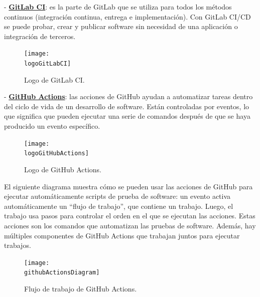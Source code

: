 - \textbf{\underline{GitLab CI}}: es la parte de GitLab que se utiliza para todos los métodos continuos (integración continua, entrega e implementación). Con GitLab CI/CD se puede probar, crear y publicar software sin necesidad de una aplicación o integración de terceros.
\begin{figure}[h]
    \centering
    \texttt{[image: \\logoGitLabCI]}
    \caption{Logo de GitLab CI.}
\end{figure}

- \textbf{\underline{GitHub Actions}}: las acciones de GitHub ayudan a automatizar tareas dentro del ciclo de vida de un desarrollo de software. Están controladas por eventos, lo que significa que pueden ejecutar una serie de comandos después de que se haya producido un evento específico.

\begin{figure}[h]
    \centering
    \texttt{[image: \\logoGitHubActions]}
    \caption{Logo de GitHub Actions.}
\end{figure}

El siguiente diagrama muestra cómo se pueden usar las acciones de GitHub para ejecutar automáticamente scripts de prueba de software: un evento activa automáticamente un “flujo de trabajo”, que contiene un trabajo. Luego, el trabajo usa pasos para controlar el orden en el que se ejecutan las acciones. Estas acciones son los comandos que automatizan las pruebas de software. Además, hay múltiples componentes de GitHub Actions que trabajan juntos para ejecutar trabajos.
\begin{figure}[h]
    \centering
    \texttt{[image: \\githubActionsDiagram]}
    \caption{Flujo de trabajo de GitHub Actions.}
\end{figure}



